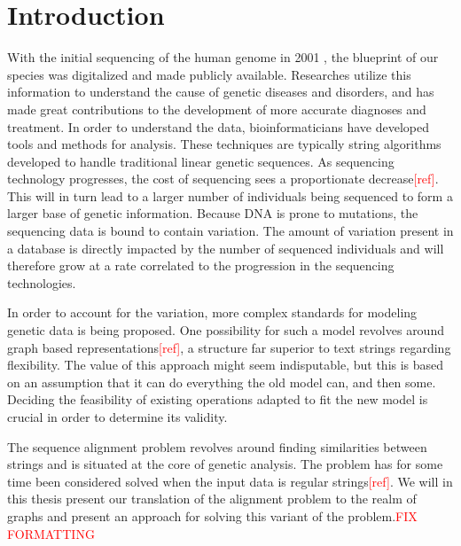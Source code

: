 \documentclass[thesis.tex]{subfiles}
\begin{document}
\chapter{Introduction}
With the initial sequencing of the human genome in 2001 \cite{human_genome}, the blueprint of our species was digitalized and made publicly available. Researches utilize this information to understand the cause of genetic diseases and disorders, and has made great contributions to the development of more accurate diagnoses and treatment. In order to understand the data, bioinformaticians have developed tools and methods for analysis. These techniques are typically string algorithms developed to handle traditional linear genetic sequences. As sequencing technology progresses, the cost of sequencing sees a proportionate decrease\textcolor{red}{[ref]}. This will in turn lead to a larger number of individuals being sequenced to form a larger base of genetic information. Because DNA is prone to mutations, the sequencing data is bound to contain variation. The amount of variation present in a database is directly impacted by the number of sequenced individuals and will therefore grow at a rate correlated to the progression in the sequencing technologies.\\
\par\noindent
In order to account for the variation, more complex standards for modeling genetic data is being proposed. One possibility for such a model revolves around graph based representations\textcolor{red}{[ref]}, a structure far superior to text strings regarding flexibility. The value of this approach might seem indisputable, but this is based on an assumption that it can do everything the old model can, and then some. Deciding the feasibility of existing operations adapted to fit the new model is crucial in order to determine its validity.\\
\par\noindent
The sequence alignment problem revolves around finding similarities between strings and is situated at the core of genetic analysis. The problem has for some time been considered solved when the input data is regular strings\textcolor{red}{[ref]}. We will in this thesis present our translation of the alignment problem to the realm of graphs and present an approach for solving this variant of the problem.\textcolor{red}{FIX FORMATTING}
\end{document}
